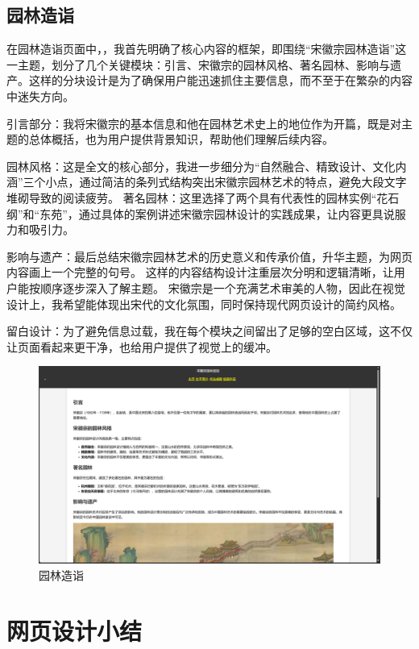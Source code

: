 \documentclass[supercite]{Experimental_Report}
\theoremstyle{definition}
\begin{document}
\subsection{园林造诣}

在园林造诣页面中，，我首先明确了核心内容的框架，即围绕“宋徽宗园林造诣”这一主题，划分了几个关键模块：引言、宋徽宗的园林风格、著名园林、影响与遗产。这样的分块设计是为了确保用户能迅速抓住主要信息，而不至于在繁杂的内容中迷失方向。
\par 引言部分：我将宋徽宗的基本信息和他在园林艺术史上的地位作为开篇，既是对主题的总体概括，也为用户提供背景知识，帮助他们理解后续内容。
\par 园林风格：这是全文的核心部分，我进一步细分为“自然融合、精致设计、文化内涵”三个小点，通过简洁的条列式结构突出宋徽宗园林艺术的特点，避免大段文字堆砌导致的阅读疲劳。
著名园林：这里选择了两个具有代表性的园林实例“花石纲”和“东苑”，通过具体的案例讲述宋徽宗园林设计的实践成果，让内容更具说服力和吸引力。
\par 影响与遗产：最后总结宋徽宗园林艺术的历史意义和传承价值，升华主题，为网页内容画上一个完整的句号。
这样的内容结构设计注重层次分明和逻辑清晰，让用户能按顺序逐步深入了解主题。
宋徽宗是一个充满艺术审美的人物，因此在视觉设计上，我希望能体现出宋代的文化氛围，同时保持现代网页设计的简约风格。
\par 留白设计：为了避免信息过载，我在每个模块之间留出了足够的空白区域，这不仅让页面看起来更干净，也给用户提供了视觉上的缓冲。
\begin{figure}[H]
    \centering
    \includegraphics[width=1\linewidth]{./images/园林造诣.png}
    \caption{园林造诣}
    \label{fig:enter-label}
\end{figure}

\section{网页设计小结}
\end{document}
